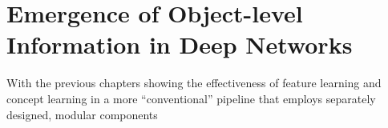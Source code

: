 \chapter{Emergence of Object-level Information in Deep Networks}

With the previous chapters showing the effectiveness of feature learning and concept learning in a more ``conventional'' pipeline that employs separately designed, modular components
